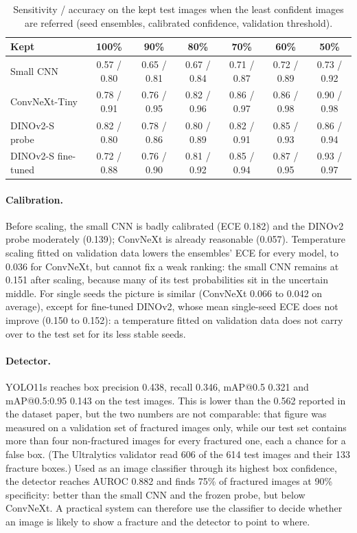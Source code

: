 \documentclass[11pt,a4paper]{article}
\begin{document}
\begin{table}[t]
\centering
\caption{Sensitivity / accuracy on the kept test images when the least confident images are referred
(seed ensembles, calibrated confidence, validation threshold).}
\label{tab:referral}
\small
\setlength{\tabcolsep}{4pt}
\begin{tabular}{lcccccc}
\toprule
Kept & 100\% & 90\% & 80\% & 70\% & 60\% & 50\% \\
\midrule
Small CNN & 0.57 / 0.80 & 0.65 / 0.81 & 0.67 / 0.84 & 0.71 / 0.87 & 0.72 / 0.89 & 0.73 / 0.92 \\
ConvNeXt-Tiny & 0.78 / 0.91 & 0.76 / 0.95 & 0.82 / 0.96 & 0.86 / 0.97 & 0.86 / 0.98 & 0.90 / 0.98 \\
DINOv2-S probe & 0.82 / 0.80 & 0.78 / 0.86 & 0.80 / 0.89 & 0.82 / 0.91 & 0.85 / 0.93 & 0.86 / 0.94 \\
DINOv2-S fine-tuned & 0.72 / 0.88 & 0.76 / 0.90 & 0.81 / 0.92 & 0.85 / 0.94 & 0.87 / 0.95 & 0.93 / 0.97 \\
\bottomrule
\end{tabular}
\end{table}

\paragraph{Calibration.} Before scaling, the small CNN is badly calibrated (ECE 0.182) and the DINOv2 probe moderately
(0.139); ConvNeXt is already reasonable (0.057). Temperature scaling fitted on validation data lowers the ensembles' ECE for every
model, to 0.036 for ConvNeXt, but cannot fix a weak ranking: the small CNN remains at 0.151 after scaling, because many
of its test probabilities sit in the uncertain middle. For single seeds the picture is similar (ConvNeXt 0.066 to
0.042 on average), except for fine-tuned DINOv2, whose mean single-seed ECE does not improve (0.150 to 0.152): a
temperature fitted on validation data does not carry over to the test set for its less stable seeds.

\paragraph{Detector.} YOLO11s reaches box precision 0.438, recall 0.346, mAP@0.5 0.321 and mAP@0.5:0.95 0.143 on the
test images. This is lower than the 0.562 reported in the dataset paper, but the two numbers are not comparable: that
figure was measured on a validation set of fractured images only, while our test set contains more than four
non-fractured images for every fractured one, each a chance for a false box. (The Ultralytics validator read 606 of the
614 test images and their 133 fracture boxes.) Used as an image classifier through its highest box
confidence, the detector reaches AUROC 0.882 and finds 75\% of fractured images at 90\% specificity: better than the
small CNN and the frozen probe, but below ConvNeXt. A practical system can therefore use the classifier to decide
whether an image is likely to show a fracture and the detector to point to where.
\end{document}
